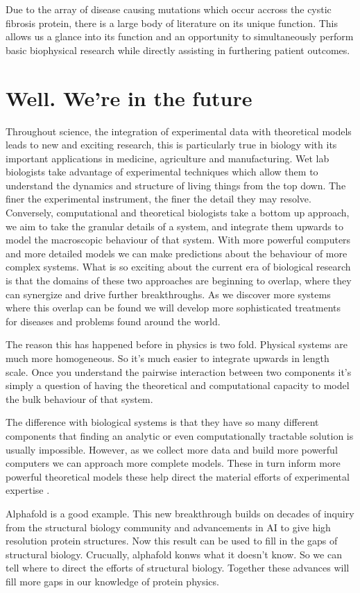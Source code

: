 Due to the array of disease causing mutations which occur accross the cystic fibrosis protein, there is a large body of literature on its unique function. This allows us a glance into its function and an opportunity to simultaneously perform basic biophysical research while directly assisting in furthering patient outcomes.  

\section{Well. We're in the future}
Throughout science, the integration of experimental data with theoretical models leads to new and exciting research, this is particularly true in biology with its important applications in medicine, agriculture and manufacturing. Wet lab biologists take advantage of experimental techniques which allow them to understand the dynamics and structure of living things from the top down. The finer the experimental instrument, the finer the detail they may resolve. Conversely, computational and theoretical biologists take a bottom up approach, we aim to take the granular details of a system, and integrate them upwards to model the macroscopic behaviour of that system. With more powerful computers and more detailed models we can make predictions about the behaviour of more complex systems. What is so exciting about the current era of biological research is that the domains of these two approaches are beginning to overlap, where they can synergize  and drive further breakthroughs. As we discover more systems where this overlap can be found we will develop more sophisticated treatments for diseases and problems found around the world.

The reason this has happened before in physics is two fold. Physical systems are much more homogeneous. So it's much easier to integrate upwards in length scale. Once you understand the pairwise interaction between two components it's simply a question of having the theoretical and computational capacity to model the bulk behaviour of that system. 

The difference with biological systems is that they have so many different components that finding an analytic or even computationally tractable solution is usually impossible. However, as we collect more data and build more powerful computers we can approach more complete models. These in turn inform more powerful theoretical models these help direct the material efforts of experimental expertise . 

Alphafold is a good example. This new breakthrough builds on decades of inquiry from the structural biology community and advancements in AI to give high resolution protein structures. Now this result can be used to fill in the gaps of structural biology. Crucually, alphafold konws what it doesn't know. So we can tell where to direct the efforts of structural biology. Together these advances will fill more gaps in our knowledge of protein physics. 
